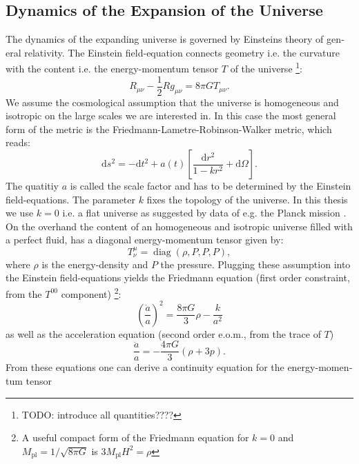 \documentclass[master,       %
               twoside,        %
               BCOR10mm,       %
               english,ngerman, %
               ]{GAUBM}
\begin{document}
\begin{otherlanguage}{english}
\subsection{Dynamics of the Expansion of the Universe}
\label{sec:dynamics_of_the_examsion_of_the_universe}
The dynamics of the expanding universe is governed by Einsteins theory of general relativity. The Einstein field-equation connects geometry i.e. the curvature with the content i.e. the energy-momentum tensor $T$ of the universe \footnote{
TODO: introduce all quantities????
}:
\begin{equation}
	R_{\mu \nu} - \frac{1}{2} R g_{\mu \nu} = 8 \pi G T_{\mu \nu}.
\end{equation}
We assume the cosmological assumption that the universe is homogeneous and isotropic on the large scales we are interested in. In this case the most general form of the metric is the Friedmann-Lametre-Robinson-Walker metric, which reads:
\begin{equation}
	\mathrm{d} s^2 = - \mathrm{d} t^2 + a(t) \left[ \frac{\mathrm{d} r^2}{1 - kr^2} + \mathrm{d} \Omega \right].
\end{equation}
The quatitiy $a$ is called the scale factor and has to be determined by the Einstein field-equations.
The parameter $k$ fixes the topology of the universe. In this thesis we use $k = 0$ i.e. a flat universe as suggested by data of e.g. the Planck mission \cite{planck2018}.
On the overhand the content of an homogeneous and isotropic universe filled with a perfect fluid, has a diagonal energy-momentum tensor given by:
\begin{equation}
	T_\nu^\mu = \operatorname{diag}(\rho, P, P, P),
\end{equation}
where $\rho$ is the energy-density and $P$ the pressure.
Plugging these assumption into the Einstein field-equations yields the Friedmann equation (first order constraint, from the $T^{00}$ component) \footnote{
A useful compact form of the Friedmann equation for $k = 0$ and $M_\mathrm{pl} = 1 / \sqrt{8 \pi G}$ is $3 M_\mathrm{pl} H^2 = \rho$
}:
\begin{equation}
	\left( \frac{\dot{a}}{a} \right)^2 = \frac{8 \pi G}{3} \rho - \frac{k}{a^2}
\end{equation}
as well as the acceleration equation (second order e.o.m., from the trace of $T$)
\begin{equation}
	\frac{\ddot{a}}{a} = - \frac{4 \pi G}{3} ( \rho + 3 p ).
\end{equation}
From these equations one can derive a continuity equation for the energy-momentum tensor

\end{otherlanguage}
\end{document}

